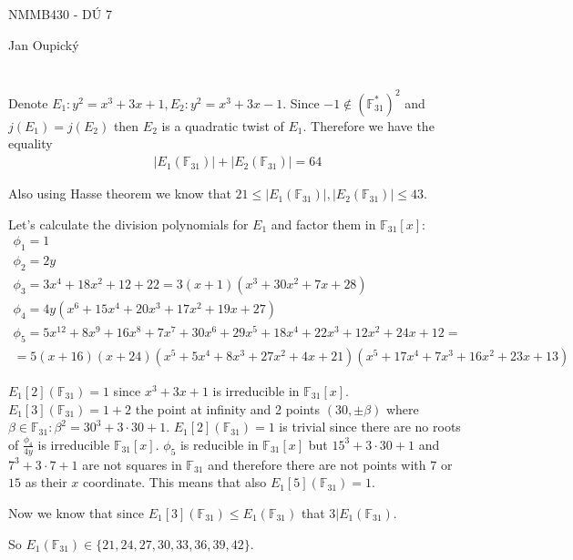 \documentclass[12pt, a4paper]{article}
\begin{document}
\begin{center}
\large NMMB430 - DÚ 7

\normalsize Jan Oupický
\end{center}
\vspace{1\baselineskip}

\section{}
Denote $E_1: y^2=x^3+3x+1, E_2: y^2=x^3+3x-1$. Since $-1 \notin (\mathbb{F}_{31}^*)^2$ and $j(E_1)=j(E_2)$ then $E_2$ is a quadratic twist of $E_1$. Therefore we have the equality
\begin{gather*}
|E_1(\mathbb{F}_{31})|+|E_2(\mathbb{F}_{31})|=64
\end{gather*}

Also using Hasse theorem we know that $21 \leq |E_1(\mathbb{F}_{31})|,|E_2(\mathbb{F}_{31})| \leq 43$.

Let's calculate the division polynomials for $E_1$ and factor them in $\mathbb{F}_{31}[x]$:
\begin{gather*}
\phi_1= 1\\
\phi_2 = 2y\\
\phi_3 = 3x^4+18x^2+12+22 = 3(x+1)(x^3+30x^2+7x+28)\\
\phi_4 = 4y(x^6+15x^4+20x^3+17x^2+19x+27)\\
\phi_5 = 5x^{12}+8x^9+16x^8+7x^7+30x^6+29x^5+18x^4+22x^3+12x^2+24x+12 = \\
=5(x+16)(x+24)(x^5+5x^4+8x^3+27x^2+4x+21)(x^5+17x^4+7x^3+16x^2+23x+13)
\end{gather*}

$E_1[2](\mathbb{F}_{31})=1$ since $x^3+3x+1$ is irreducible in $\mathbb{F}_{31}[x]$. $E_1[3](\mathbb{F}_{31})=1+2$ the point at infinity and 2 points $(30,\pm \beta)$ where $\beta \in \mathbb{F}_{31}:\beta^2=30^3+3\cdot30+1$. $E_1[2](\mathbb{F}_{31})=1$ is trivial since there are no roots of $\frac{\phi_4}{4y}$ is irreducible $\mathbb{F}_{31}[x]$. $\phi_5$ is reducible in $\mathbb{F}_{31}[x]$ but $15^3+3\cdot30+1$ and $7^3+3\cdot7+1$ are not squares in $\mathbb{F}_{31}$ and therefore there are not points with $7$ or $15$ as their $x$ coordinate. This means that also $E_1[5](\mathbb{F}_{31})=1$.

Now we know that since $E_1[3](\mathbb{F}_{31}) \leq E_1(\mathbb{F}_{31})$ that $3|E_1(\mathbb{F}_{31})$. 

So $E_1(\mathbb{F}_{31}) \in \{21, 24, 27, 30, 33, 36, 39, 42\}$.
\end{document}
